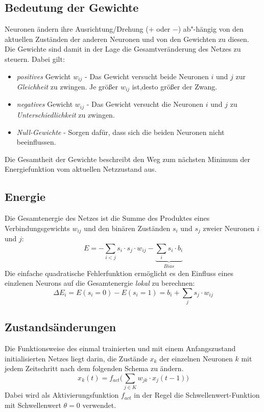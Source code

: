 \subsection*{Bedeutung der Gewichte}
Neuronen ändern ihre Ausrichtung/Drehung ($+$ oder $-$) ab"-hängig von den aktuellen Zuständen der anderen Neuronen und von den Gewichten zu diesen. Die Gewichte sind damit in der Lage die Gesamtveränderung des Netzes zu steuern.
Dabei gilt:
\begin{itemize}
	\item \emph{positives} Gewicht $w_{ij}$ - Das Gewicht versucht beide Neuronen $i$ und $j$ zur \emph{Gleichheit} zu zwingen. Je größer $w_{ij}$ ist,desto größer der Zwang.
	\item \emph{negatives} Gewicht $w_{ij}$ - Das Gewicht versucht die Neuronen $i$ und $j$ zu \emph{Unterschiedlichkeit} zu zwingen.
	\item \emph{Null-Gewichte} - Sorgen dafür, dass sich die beiden Neuronen nicht beeinflussen.
\end{itemize}

Die Gesamtheit der Gewichte beschreibt den Weg zum nächsten Minimum der Energiefunktion vom aktuellen Netzzustand aus.


\subsection*{Energie}
Die Gesamtenergie des Netzes ist die Summe des Produktes eines Verbindungsgewichts $w_{ij}$ und den binären Zuständen $s_i$ und $s_j$ zweier Neuronen $i$ und $j$:
\[
	E = - \sum_{i<j} s_i \cdot s_j \cdot w_{ij} - 
		\underbrace{\sum_i s_i \cdot b_i}_{Bias}
\]
Die einfache quadratische Fehlerfunktion ermöglicht es den Einfluss eines einzlenen Neurons auf die Gesamtenergie \emph{lokal} zu berechnen:
\[
	\Delta E_i = E(s_i = 0) - E(s_i = 1) = b_i + \sum_j s_j \cdot w_{ij}
\] 

\subsection*{Zustandsänderungen}
Die Funktionsweise des einmal trainierten und mit einem Anfangszustand initialisierten Netzes liegt darin, die Zustände $x_k$ der einzelnen Neuronen $k$ mit jedem Zeitschritt nach dem folgenden Schema zu ändern.
\[
	x_k(t) = f_{act}\Big( \sum_{j \in K} w_{jk} \cdot x_j(t-1) \Big)
\]
Dabei wird als Aktivierungsfunktion $f_{act}$ in der Regel die Schwellenwert-Funktion mit Schwellenwert $\theta = 0$ verwendet.

